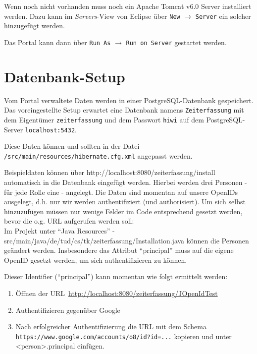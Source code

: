 \documentclass[article,colorback,accentcolor=tud2c]{tudreport}
\begin{document}
Wenn noch nicht vorhanden muss noch ein Apache Tomcat v6.0 Server installiert werden. Dazu kann im \emph{Servers}-View von Eclipse über \texttt{New} $\rightarrow$ \texttt{Server} ein solcher hinzugefügt werden.

Das Portal kann dann über \texttt{Run As} $\rightarrow$ \texttt{Run on Server} gestartet werden.


\section{Datenbank-Setup} %
\label{sec:datenbank_setup}

Vom Portal verwaltete Daten werden in einer PostgreSQL-Datenbank gespeichert. Das voreingestellte Setup erwartet eine Datenbank namens \texttt{Zeiterfassung} mit dem Eigentümer \texttt{zeiterfassung} und dem Passwort \texttt{hiwi} auf dem PostgreSQL-Server \texttt{localhost:5432}.

Diese Daten können und sollten in der Datei \texttt{/src/main/resources/hibernate.cfg.xml} angepasst werden.

Beispieldaten können über http://localhost:8080/zeiterfassung/install automatisch in die Datenbank eingefügt werden. Hierbei werden drei Personen - für jede Rolle eine - angelegt. Die Daten sind momentan auf unsere OpenIDs ausgelegt, d.h. nur wir werden authentifiziert (und authorisiert). Um sich selbst hinzuzufügen müssen nur wenige Felder im Code entsprechend gesetzt werden, bevor die o.g. URL aufgerufen werden soll:\\

Im Projekt unter ``Java Resources'' - src/main/java/de/tud/cs/tk/zeiterfassung/Installation.java können die Personen geändert werden. Insbesondere das Attribut ``principal'' muss auf die eigene OpenID gesetzt werden, um sich authentifizieren zu können.

Dieser Identifier (``principal'') kann momentan wie folgt ermittelt werden:

\begin{enumerate}
    \item Öffnen der URL~\url{http://localhost:8080/zeiterfassung/JOpenIdTest}
    \item Authentifizieren gegenüber Google
    \item Nach erfolgreicher Authentifizierung die URL mit dem Schema \texttt{https://www.google.com/accounts/o8/id?id=...} kopieren und unter <person>.principal einfügen.
\end{enumerate}
\end{document}
